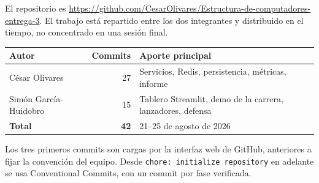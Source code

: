 \documentclass[12pt,a4paper]{article}
\begin{document}
El repositorio es
\url{https://github.com/CesarOlivares/Estructura-de-computadores-entrega-3}.
El trabajo está repartido entre los dos integrantes y distribuido en el tiempo,
no concentrado en una sesión final.

\begin{table}[H]
\centering
\footnotesize
\begin{tabular}{@{}lrl@{}}
\toprule
\textbf{Autor} & \textbf{Commits} & \textbf{Aporte principal} \\
\midrule
César Olivares & 27 & Servicios, Redis, persistencia, métricas, informe \\
Simón García-Huidobro & 15 & Tablero Streamlit, demo de la carrera, lanzadores, defensa \\
\midrule
\textbf{Total} & \textbf{42} & 21--25 de agosto de 2026 \\
\bottomrule
\end{tabular}
\end{table}

Los tres primeros commits son cargas por la interfaz web de GitHub, anteriores a
fijar la convención del equipo. Desde \texttt{chore: initialize repository} en
adelante se usa Conventional Commits, con un commit por fase verificada.
\end{document}
